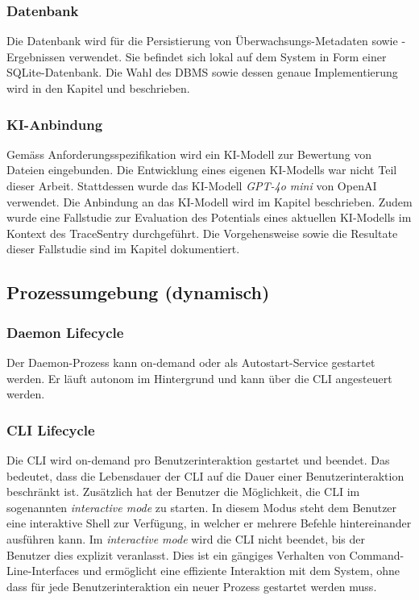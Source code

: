 \documentclass[a4paper,12pt]{report}
\begin{document}
    \subsubsection{Datenbank}\label{subsubsec:spezifikation-datenbank}
    Die Datenbank wird für die Persistierung von Überwachsungs-Metadaten sowie -Ergebnissen verwendet.
    Sie befindet sich lokal auf dem System in Form einer SQLite-Datenbank.
    Die Wahl des DBMS sowie dessen genaue Implementierung wird in den Kapitel  und  beschrieben.

    \subsubsection{KI-Anbindung}\label{subsubsec:spezifikation-ki-anbindung}
    Gemäss Anforderungsspezifikation wird ein KI-Modell zur Bewertung von Dateien eingebunden.
    Die Entwicklung eines eigenen KI-Modells war nicht Teil dieser Arbeit.
    Stattdessen wurde das KI-Modell \textit{GPT-4o mini} von OpenAI verwendet.
    Die Anbindung an das KI-Modell wird im Kapitel  beschrieben.
    Zudem wurde eine Fallstudie zur Evaluation des Potentials eines aktuellen KI-Modells im Kontext des TraceSentry durchgeführt.
    Die Vorgehensweise sowie die Resultate dieser Fallstudie sind im Kapitel  dokumentiert.

    \clearpage

    \subsection{Prozessumgebung (dynamisch)}\label{subsec:prozessumgebung}

    \subsubsection{Daemon Lifecycle}
    Der Daemon-Prozess kann on-demand oder als Autostart-Service gestartet werden.
    Er läuft autonom im Hintergrund und kann über die CLI angesteuert werden.

    \subsubsection{CLI Lifecycle}
    Die CLI wird on-demand pro Benutzerinteraktion gestartet und beendet.
    Das bedeutet, dass die Lebensdauer der CLI auf die Dauer einer Benutzerinteraktion beschränkt ist.
    Zusätzlich hat der Benutzer die Möglichkeit, die CLI im sogenannten \textit{interactive mode} zu starten.
    In diesem Modus steht dem Benutzer eine interaktive Shell zur Verfügung, in welcher er mehrere Befehle hintereinander ausführen kann.
    Im \textit{interactive mode} wird die CLI nicht beendet, bis der Benutzer dies explizit veranlasst.
    Dies ist ein gängiges Verhalten von Command-Line-Interfaces und ermöglicht eine effiziente Interaktion mit dem System, ohne dass für jede Benutzerinteraktion ein neuer Prozess gestartet werden muss.
\end{document}
